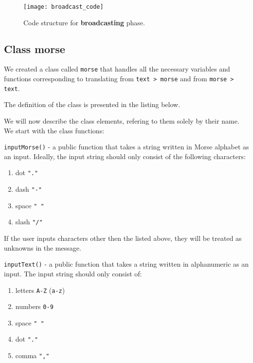 \documentclass[12pt]{report}
\begin{document}
\begin{figure}[H]
\centering\texttt{[image: broadcast\_code]}
\caption{Code structure for \textbf{broadcasting} phase.}				
\label{fig:br_code}
\end{figure}





\subsection{Class morse}

We created a class called \verb|morse| that handles all the necessary variables and functions corresponding to translating from \verb|text > morse| and from \verb|morse > text|.

The definition of the class is presented in the listing below.




We will now describe the class elements, refering to them solely by their name. We start with the class functions:

\verb|inputMorse()| - a public function that takes a string written in Morse alphabet as an input. Ideally, the input string should only consist of the following characters:

\begin{enumerate}
\item dot \verb|"."|

\item dash \verb|"-"|

\item space \verb|" "|

\item slash \verb|"/"|
\end{enumerate}

If the user inputs characters other then the listed above, they will be treated as unknowns in the message.




\verb|inputText()| - a public function that takes a string written in alphanumeric as an input. The input string should only consist of:

\begin{enumerate}
\item letters \verb|A-Z| (\verb|a-z|)
\item numbers \verb|0-9|
\item space \verb|" "|
\item dot \verb|"."|
\item comma \verb|","|
\end{enumerate}
\end{document}
